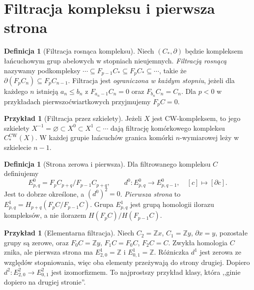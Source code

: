 \documentclass[11pt,a4paper,oneside]{report}
\newcommand{\Z}{\mathbb{Z}}
\theoremstyle{plain}
\theoremstyle{definition}
\newtheorem{definicja}[twierdzenie]{Definicja}
\newtheorem{przyklad}[twierdzenie]{Przykład}
\theoremstyle{remark}
\begin{document}
\section{Filtracja kompleksu i pierwsza strona}
\begin{definicja}[Filtracja rosnąca kompleksu]
Niech $(C_*,\partial)$ będzie kompleksem łańcuchowym grup abelowych
w stopniach nieujemnych. \emph{Filtracją rosnącą} nazywamy
podkompleksy
$\cdots\subseteq F_{p-1}C_*\subseteq F_pC_*\subseteq\cdots$,
takie że $\partial(F_pC_n)\subseteq F_pC_{n-1}$.
Filtracja jest \emph{ograniczona w każdym stopniu}, jeżeli
dla każdego $n$ istnieją $a_n\le b_n$ z
$F_{a_n-1}C_n=0$ oraz $F_{b_n}C_n=C_n$.
Dla $p<0$ w przykładach pierwszoćwiartkowych przyjmujemy $F_pC=0$.
\end{definicja}
\begin{przyklad}[Filtracja przez szkielety]
Jeżeli $X$ jest CW-kompleksem, to jego szkielety
$X^{-1}=\varnothing\subset X^0\subset X^1\subset\cdots$
dają filtrację komórkowego kompleksu $C_*^{\mathrm{CW}}(X)$.
W każdej grupie łańcuchów granica komórki $n$-wymiarowej
leży w szkielecie $n-1$.
\end{przyklad}
\begin{definicja}[Strona zerowa i pierwsza]
Dla filtrowanego kompleksu $C$ definiujemy
\[
E^0_{p,q}=F_pC_{p+q}/F_{p-1}C_{p+q},\qquad
 d^0:E^0_{p,q}\to E^0_{p,q-1},\quad [c]\mapsto[\partial c].
\]
Jest to dobrze określone, a $(d^0)^2=0$.
\emph{Pierwsza strona} to $E^1_{p,q}=H_{p+q}(F_pC/F_{p-1}C)$.
Grupa $E^1_{p,q}$ jest grupą homologii ilorazu kompleksów,
a nie ilorazem $H(F_pC)/H(F_{p-1}C)$.
\end{definicja}
\begin{przyklad}[Elementarna filtracja]
Niech $C_2=\Z x$, $C_1=\Z y$, $\partial x=y$,
pozostałe grupy są zerowe, oraz $F_0C=\Z y$,
$F_1C=F_0C$, $F_2C=C$. Zwykła homologia $C$ znika,
ale pierwsza strona ma $E^1_{2,0}=\Z$ i $E^1_{0,1}=\Z$.
Różniczka $d^1$ jest zerowa ze względów stopniowania,
więc oba elementy przeżywają do strony drugiej.
Dopiero $d^2:E^2_{2,0}\to E^2_{0,1}$ jest izomorfizmem.
To najprostszy przykład klasy, która ,,ginie dopiero na drugiej stronie''.
\end{przyklad}
\end{document}
